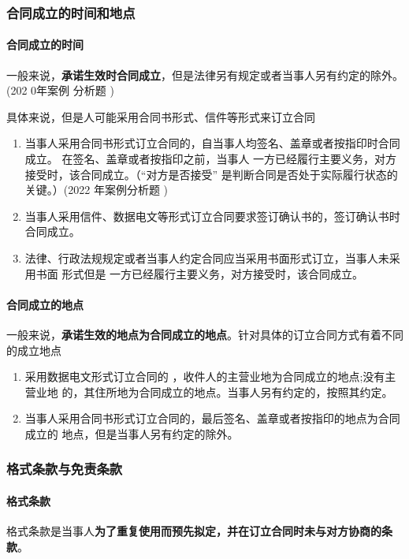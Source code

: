 \documentclass[UTF8,12pt]{ctexart}
\numberwithin{equation}{section} %
\numberwithin{figure}{section}
\numberwithin{table}{section}
\begin{document}
	\subsubsection{合同成立的时间和地点}
	\paragraph{合同成立的时间}
	一般来说，\textbf{承诺生效时合同成立}，但是法律另有规定或者当事人另有约定的除外。(202 0年案例 分析题 )
	
	具体来说，但是人可能采用合同书形式、信件等形式来订立合同
	\begin{enumerate}
		\item 当事人采用合同书形式订立合同的，自当事人均签名、盖章或者按指印时合同成立。 在签名、盖章或者按指印之前，当事人 一方已经履行主要义务，对方接受时，该合同成立。（“对方是否接受” 是判断合同是否处于实际履行状态的关键。）(2022 年案例分析题 )
		
		\item 当事人采用信件、数据电文等形式订立合同要求签订确认书的，签订确认书时合同成立。
		
		\item 法律、行政法规规定或者当事人约定合同应当采用书面形式订立，当事人未采用书面 形式但是 一方已经履行主要义务，对方接受时，该合同成立。
	\end{enumerate}
	
	
	\paragraph{合同成立的地点}
	一般来说，\textbf{承诺生效的地点为合同成立的地点}。针对具体的订立合同方式有着不同的成立地点
	\begin{enumerate}
		\item 采用数据电文形式订立合同的 ，收件人的主营业地为合同成立的地点;没有主营业地 的，其住所地为合同成立的地点。当事人另有约定的，按照其约定。
		
		\item 当事人采用合同书形式订立合同的，最后签名、盖章或者按指印的地点为合同成立的 地点，但是当事人另有约定的除外。
	\end{enumerate}

	
	\subsubsection{格式条款与免责条款}
	\paragraph{格式条款}
	格式条款是当事人\textbf{为了重复使用而预先拟定，并在订立合同时未与对方协商的条款}。
	
\end{document}

